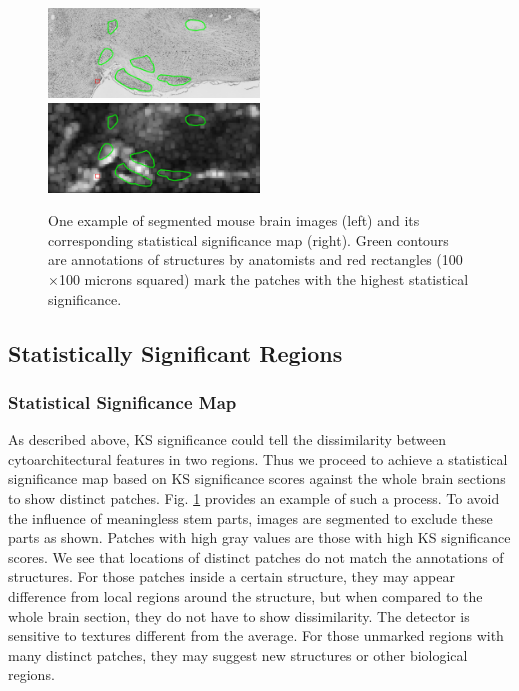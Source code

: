 \documentclass[runningheads]{llncs}
\begin{document}
\begin{figure}
\includegraphics[width=0.5\textwidth]{ground.jpg}
\includegraphics[width=0.5\textwidth]{KSmap_3d.jpg}
\caption{One example of segmented mouse brain images (left) and its corresponding statistical significance map (right). Green contours are annotations of structures by anatomists and red rectangles (100$\times$100 microns squared) mark the patches with the highest statistical significance.}
\label{significancemap}
\end{figure}

\subsection{Statistically Significant Regions}

\subsubsection{Statistical Significance Map}

As described above, KS significance could tell the dissimilarity between cytoarchitectural features in two regions. Thus we proceed to achieve a statistical significance map based on KS significance scores against the whole brain sections to show distinct patches. Fig. \ref{significancemap} provides an example of such a process. To avoid the influence of meaningless stem parts, images are segmented to exclude these parts as shown. Patches with high gray values are those with high KS significance scores. We see that locations of distinct patches do not match the annotations of structures. For those patches inside a certain structure, they may appear difference from local regions around the structure, but when compared to the whole brain section, they do not have to show dissimilarity. The detector is sensitive to textures different from the average. For those unmarked regions with many distinct patches, they may suggest new structures or other biological regions. 
\end{document}

